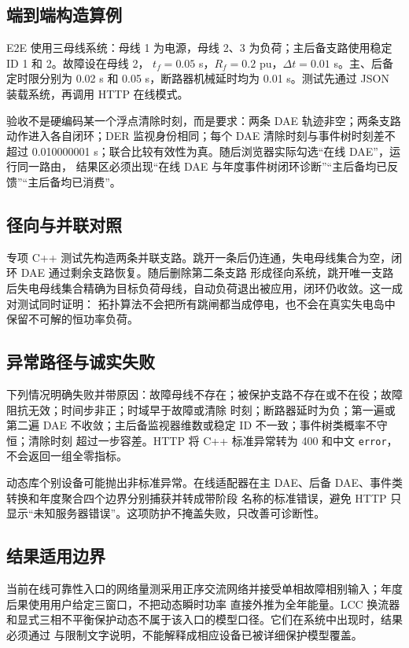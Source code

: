 \subsection{端到端构造算例}
E2E 使用三母线系统：母线 1 为电源，母线 2、3 为负荷；主后备支路使用稳定 ID 1 和 2。故障设在母线 2，
$t_f=0.05$ s，$R_f=0.2$ pu，$\Delta t=0.01$ s。主、后备定时限分别为 0.02 s 和 0.05 s，断路器机械延时均为
0.01 s。测试先通过 JSON 装载系统，再调用 HTTP 在线模式。

验收不是硬编码某一个浮点清除时刻，而是要求：两条 DAE 轨迹非空；两条支路动作进入各自闭环；DER 监视身份相同；每个
DAE 清除时刻与事件树时刻差不超过 0.010000001 s；联合比较有效性为真。随后浏览器实际勾选“在线 DAE”，运行同一路由，
结果区必须出现“在线 DAE 与年度事件树闭环诊断”“主后备均已反馈”“主后备均已消费”。

\subsection{径向与并联对照}
专项 C++ 测试先构造两条并联支路。跳开一条后仍连通，失电母线集合为空，闭环 DAE 通过剩余支路恢复。随后删除第二条支路
形成径向系统，跳开唯一支路后失电母线集合精确为目标负荷母线，自动负荷退出被应用，闭环仍收敛。这一成对测试同时证明：
拓扑算法不会把所有跳闸都当成停电，也不会在真实失电岛中保留不可解的恒功率负荷。

\subsection{异常路径与诚实失败}
下列情况明确失败并带原因：故障母线不存在；被保护支路不存在或不在役；故障阻抗无效；时间步非正；时域早于故障或清除
时刻；断路器延时为负；第一遍或第二遍 DAE 不收敛；主后备监视器维数或稳定 ID 不一致；事件树类概率不守恒；清除时刻
超过一步容差。HTTP 将 C++ 标准异常转为 400 和中文 \verb|error|，不会返回一组全零指标。

动态库个别设备可能抛出非标准异常。在线适配器在主 DAE、后备 DAE、事件类转换和年度聚合四个边界分别捕获并转成带阶段
名称的标准错误，避免 HTTP 只显示“未知服务器错误”。这项防护不掩盖失败，只改善可诊断性。

\subsection{结果适用边界}
当前在线可靠性入口的网络量测采用正序交流网络并接受单相故障相别输入；年度后果使用用户给定三窗口，不把动态瞬时功率
直接外推为全年能量。LCC 换流器和显式三相不平衡保护动态不属于该入口的模型口径。它们在系统中出现时，结果必须通过
 与限制文字说明，不能解释成相应设备已被详细保护模型覆盖。

